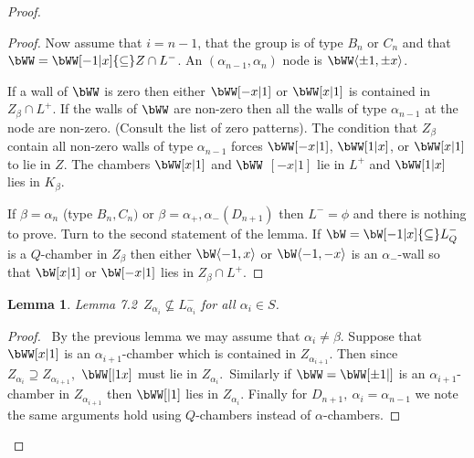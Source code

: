 \documentclass{memo-l}
\newtheorem{lemma}[theorem]{Lemma}
\theoremstyle{definition}
\theoremstyle{remark}
\numberwithin{section}{chapter}
\numberwithin{equation}{chapter}
\begin{document}
\begin{proof}
\begin{proof}
   Now assume that $i = n-1$, that the group is of type $B_{n}$ or $C_{n}$
and that $\bWW= \bWW [-1\vert x]{\subseteq} Z \cap L^{-}$.  An
$({\alpha}_{n-1},{\alpha}_{n})$ node is $\bWW\langle
{\pm}1,{\pm}x\rangle $.

\medskip
\medskip

\noindent
If a wall of $\bWW$ is zero then either $\bWW[-x\vert 1]$ or
$\bWW[x\vert 1]$ is contained in $Z_{{\beta}} \cap L^{+}$.  If the walls of
$\bWW$ are non-zero then all the walls of type ${\alpha}_{n-1}$ at the
node are non-zero.  (Consult the list of zero patterns).  The condition
that $Z_{{\beta}}$ contain all non-zero walls of type ${\alpha}_{n-1}$
forces $\bWW[-x\vert 1]$, $\bWW[1\vert x]$, or $\bWW[x\vert
1]$ to lie in $Z$.  The chambers $\bWW[x\vert 1]$ and $\bWW$
$[-x\vert 1]$ lie in $L^{+}$ and $\bWW[1\vert x]$ lies in
$K_{{\beta}}$.

   If ${\beta} = {\alpha}_{n}$ (type $B_{n}, C_{n})$ or ${\beta} =
{\alpha}_{+},{\alpha}_{-} (D_{n+1})$ then $L^{-} = {\phi}$ and there is
nothing to prove.  Turn to the second statement of the lemma.  If $\bW
 = \bW [-1\vert x] {\subseteq} L_{Q}^{-}$ is a $Q$-chamber in
$Z_{{\beta}}$ then either $\bW \langle -1,x\rangle$ or $\bW\langle -1,-x\rangle $ is an
${\alpha}_{-}$-wall so that $\bW [x\vert 1]$ or $\bW [-x\vert 1]$
lies in $Z_{{\beta}}\cap L^+$.
\end{proof}

{\medskip}



\begin{lemma}{Lemma 7.2}\ $Z_{\alpha_i} {\not\subseteq} L_{{\alpha_i}}^{-}$ for
all ${\alpha}_{i}  \in  S$.
\end{lemma}

\begin{proof} \ By the previous lemma we may assume that ${\alpha}_{i}
\ne {\beta}$.  Suppose that $\bWW[x\vert 1]$ is an
${\alpha}_{i+1}$-chamber which is contained in $Z_{\alpha_{i+1}}.$
Then since $Z_{\alpha_i} {\supseteq} Z_{\alpha_{i+1}},$
$\bWW[\vert 1x]$ must lie in $Z_{\alpha_i}.$\
Similarly if $\bWW = \bWW[{\pm}1\vert ]$ is an ${\alpha}_{i+1}$-chamber in
$Z_{\alpha_{i+1}}$ then $\bWW[\vert 1]$ lies in
$Z_{\alpha_i}.$ Finally for $D_{n+1},\  {\alpha}_{i} = {\alpha}_{n-1}$ we
note the same arguments hold using $Q$-chambers instead of
${\alpha}$-chambers.
\end{proof}

{\medskip}




\end{proof}
\end{document}
